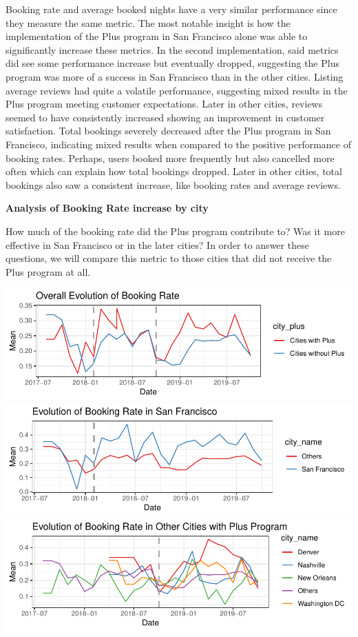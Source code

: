 \documentclass[
  12pt,
]{article}
\begin{document}
Booking rate and average booked nights have a very similar performance
since they measure the same metric. The most notable insight is how the
implementation of the Plus program in San Francisco alone was able to
significantly increase these metrics. In the second implementation, said
metrics did see some performance increase but eventually dropped,
suggesting the Plus program was more of a success in San Francisco than
in the other cities. Listing average reviews had quite a volatile
performance, suggesting mixed results in the Plus program meeting
customer expectations. Later in other cities, reviews seemed to have
consistently increased showing an improvement in customer satisfaction.
Total bookings severely decreased after the Plus program in San
Francisco, indicating mixed results when compared to the positive
performance of booking rates. Perhaps, users booked more frequently but
also cancelled more often which can explain how total bookings dropped.
Later in other cities, total bookings also saw a consistent increase,
like booking rates and average reviews.

\textbf{Analysis of Booking Rate increase by city}

How much of the booking rate did the Plus program contribute to? Was it
more effective in San Francisco or in the later cities? In order to
answer these questions, we will compare this metric to those cities that
did not receive the Plus program at all.

\includegraphics{Group-D---Assignment-1_files/figure-latex/unnamed-chunk-12-1.pdf}
\includegraphics{Group-D---Assignment-1_files/figure-latex/unnamed-chunk-12-2.pdf}
\includegraphics{Group-D---Assignment-1_files/figure-latex/unnamed-chunk-12-3.pdf}
\end{document}
